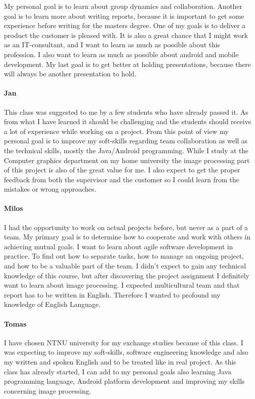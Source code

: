 My personal goal is to learn about group dynamics and collaboration. Another goal is to learn more about writing reports, because it is important to get some experience before writing for the masters degree. One of my goals is to deliver a product the customer is pleased with. It is also a great chance that I might work as an IT-consultant, and I want to learn as much as possible about this profession. I also want to learn as much as possible about android and mobile development. My last goal is to get better at holding presentations, because there will always be another presentation to hold. 

\paragraph{Jan}

This class was suggested to me by a few students who have already passed it. As from what I have learned it should be challenging and the students should receive a lot of experience while working on a project. From this point of view my personal goal is to improve my soft-skills regarding team collaboration as well as the technical skills, mostly the Java/Android programming. While I study at the Computer graphics department on my home university the image processing part of this project is also of the great value for me. I also expect to get the proper feedback from both the supervisor and the customer so I could learn from the mistakes or wrong approaches.

\paragraph{Milos}

I had the opportunity to work on actual projects before, but never as a part of a team. 
My primary goal is to determine how to cooperate and work with others in achieving mutual goals.
I want to learn about agile software development in practice.
To find out how to separate tasks, how to manage an ongoing project, and how to be a valuable part of the team.
I didn't expect to gain any technical knowledge of this course, but after discovering the project assignment I definitely want to learn about image processing.
I expected multicultural team and that report has to be written in English.
Therefore I wanted to profound my knowledge of English Language.

\paragraph{Tomas}
I have chosen NTNU university for my exchange studies because of this class. 
I was expecting to improve my soft-skills, software engineering knowledge and also my written and spoken English and to be treated like in real project.
As this class has already started, I can add to my personal goals also learning Java programming language,
Android platform development and improving my skills concerning image processing.

